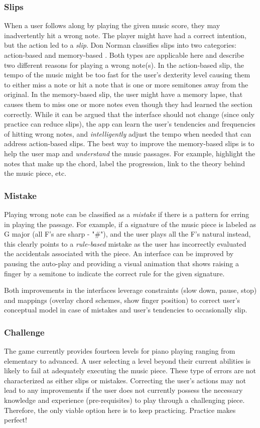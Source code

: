 \documentclass[12pt,letterpaper]{article}
\begin{document}
\subsubsection*{Slips}
When a user follows along by playing the given music score, they may inadvertently hit a wrong note. The player might have had a correct intention, but the action led to a \textit{slip}. Don Norman classifies slips into two categories: action-based and memory-based \cite{norman2013design}. Both types are applicable here and describe two different reasons for playing a wrong note(s). In the action-based slip, the tempo of the music might be too fast for the user's dexterity level causing them to either miss a note or hit a note that is one or more semitones away from the original. In the memory-based slip, the user might have a memory lapse, that causes them to miss one or more notes even though they had learned the section correctly. While it can be argued that the interface should not change (since only practice can reduce slips), the app can learn the user's tendencies and frequencies of hitting wrong notes, and \textit{intelligently} adjust the tempo when needed that can address action-based slips. The best way to improve the memory-based slips is to help the user map and \textit{understand} the music passages. For example, highlight the notes that make up the chord, label the progression, link to the theory behind the music piece, etc.         

\subsubsection*{Mistake}
Playing wrong note can be classified as a \textit{mistake} if there is a pattern for erring in playing the passage. For example, if a signature of the music piece is labeled as G major (all F's are sharp - "\#"), and the user plays all the F's natural instead, this clearly points to a \textit{rule-based} mistake as the user has incorrectly evaluated the accidentals associated with the piece. An interface can be improved by pausing the auto-play and providing a visual animation that shows raising a finger by a semitone to indicate the correct rule for the given signature.

Both improvements in the interfaces leverage constraints (slow down, pause, stop) and mappings (overlay chord schemes, show finger position) to correct user's conceptual model in case of mistakes and user's tendencies to occasionally slip.

\subsubsection*{Challenge}
The game currently provides fourteen levels for piano playing ranging from elementary to advanced. A user selecting a level beyond their current abilities is likely to fail at adequately executing the music piece. These type of errors are not characterized as either slips or mistakes. Correcting the user's actions may not lead to any improvements if the user does not currently possess the necessary knowledge and experience (pre-requisites) to play through a challenging piece. Therefore, the only viable option here is to keep practicing. Practice makes perfect!
\end{document}
